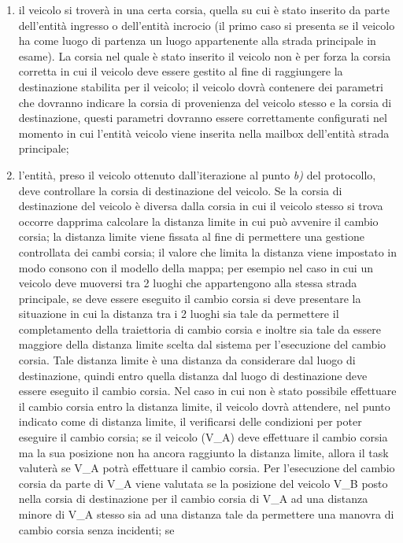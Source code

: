 \begin{enumerate}
\begin{enumerate}
\item il veicolo si troverà in una certa corsia, quella su cui è stato inserito
da parte dell'entità ingresso o dell'entità incrocio (il primo caso si presenta
se il veicolo ha come luogo di partenza un luogo appartenente alla strada
principale in esame). La corsia nel quale è stato inserito il veicolo non è per
forza la corsia corretta in cui il veicolo deve essere gestito al fine di
raggiungere la destinazione stabilita per il veicolo; il veicolo dovrà
contenere dei parametri che dovranno indicare la corsia di provenienza del
veicolo stesso e la corsia di destinazione, questi parametri dovranno essere
correttamente configurati nel momento in cui l'entità veicolo viene inserita
nella mailbox dell'entità strada principale;
\item l'entità, preso il veicolo ottenuto dall'iterazione al punto \textit{b)}
del protocollo, deve controllare la corsia di destinazione del veicolo. Se la
corsia di destinazione del veicolo è diversa dalla corsia in cui il veicolo
stesso si trova occorre dapprima calcolare la distanza limite in cui può
avvenire il cambio corsia; la distanza limite viene fissata al fine di
permettere una gestione controllata dei cambi corsia; il valore che limita la
distanza viene impostato in modo consono con il modello della mappa; per
esempio nel caso in cui un veicolo deve muoversi tra 2 luoghi che appartengono
alla stessa strada principale, se deve essere eseguito il cambio corsia si deve
presentare la situazione in cui la distanza tra i 2 luoghi sia tale da
permettere il completamento della traiettoria di cambio corsia e inoltre sia
tale da essere maggiore della distanza limite scelta dal sistema per
l'esecuzione del cambio corsia. Tale distanza limite è una distanza da
considerare dal luogo di destinazione, quindi entro quella distanza dal luogo
di destinazione deve essere eseguito il cambio corsia. Nel caso in cui non è
stato possibile effettuare il cambio corsia entro la distanza limite, il
veicolo dovrà attendere, nel punto indicato come di distanza limite, il
verificarsi delle condizioni per poter eseguire il cambio corsia; se il veicolo
(V\_A) deve effettuare il cambio corsia ma la sua posizione non ha ancora
raggiunto la distanza limite, allora il task valuterà se V\_A potrà effettuare
il cambio corsia. Per l'esecuzione del cambio corsia da parte di V\_A viene
valutata se la posizione del veicolo V\_B posto nella corsia di destinazione
per il cambio corsia di V\_A ad una distanza minore di V\_A stesso sia ad una
distanza tale da permettere una manovra di cambio corsia senza incidenti; se

\end{enumerate}
\end{enumerate}
